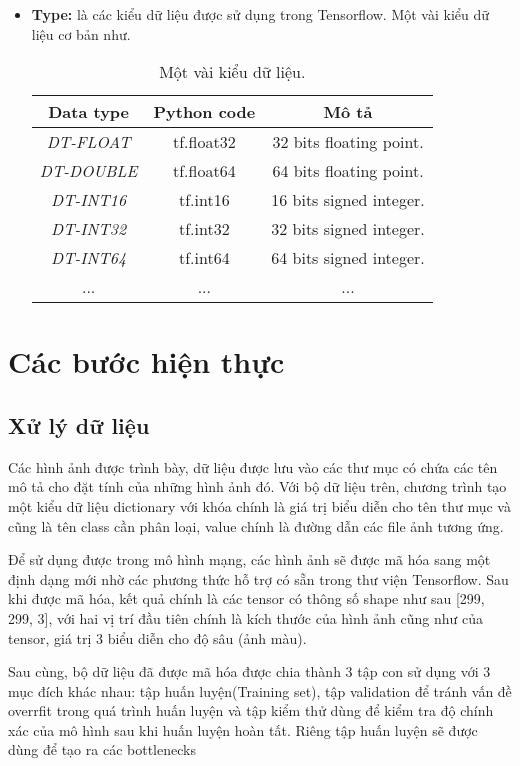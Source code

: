 \begin{itemize}
		\item \textbf{Type:} là các kiểu dữ liệu được sử dụng trong Tensorflow. Một vài kiểu dữ liệu cơ bản như.\\
		\begin{table}[h!]
			\centering
			\begin{tabular}{ | c | c | c | }
 			\hline
 			 \textbf{Data type} & \textbf{Python code} & \textbf{Mô tả}\\
 			\hline
 			\textit{DT-FLOAT}  & tf.float32  & 32 bits floating point.  \\
			\hline
			\textit{DT-DOUBLE} & tf.float64 & 64 bits floating point.\\
			\hline
			\textit{DT-INT16} & tf.int16	 & 16 bits signed integer.\\
			\hline
			\textit{DT-INT32} & tf.int32	 & 32 bits signed integer.	\\
			\hline
			\textit{DT-INT64} & tf.int64	 & 64 bits signed integer. \\
			\hline
			... & ... & ...\\
			\hline
			
		\end{tabular}
		\caption{Một vài kiểu dữ liệu.}
		\label{table:type}
		\end{table}
		\pagebreak
		
		
	\end{itemize}
	
	

\section{Các bước hiện thực}

	\subsection{Xử lý dữ liệu}
	
		Các hình ảnh được trình bày, dữ liệu được lưu vào các thư mục có chứa các tên mô tả cho đặt tính của những hình ảnh đó. Với bộ dữ liệu trên, chương trình tạo một kiểu dữ liệu dictionary với khóa chính là giá trị biểu diễn cho tên thư mục và cũng là tên class cần phân loại, value chính là đường dẫn các file ảnh tương ứng.\par
		 Để sử dụng được trong mô hình mạng, các hình ảnh sẽ được mã hóa sang một định dạng mới nhờ các phương thức hỗ trợ có sẵn trong thư viện Tensorflow. Sau khi được mã hóa, kết quả chính là các tensor có thông số shape như sau [299, 299, 3], với hai vị trí đầu tiên chính là kích thước của hình ảnh cũng như của tensor, giá trị 3 biểu diễn cho độ sâu (ảnh màu).\par
	 	Sau cùng, bộ dữ liệu đã được mã hóa được chia thành 3 tập con sử dụng với 3 mục đích khác nhau: tập huấn luyện(Training set), tập validation để tránh vấn đề overrfit trong quá trình huấn luyện và tập kiểm thử dùng để kiểm tra độ chính xác của mô hình sau khi huấn luyện hoàn tất.	Riêng tập huấn luyện sẽ được dùng để tạo ra các bottlenecks
	
